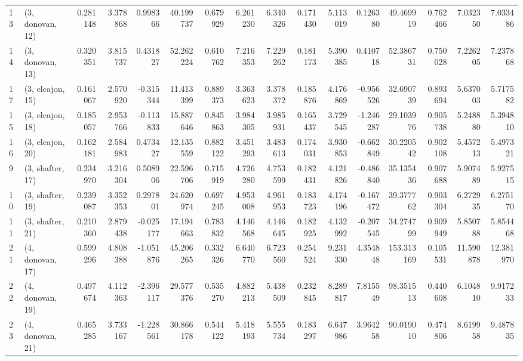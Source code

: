 \begin{tabular}{llrrrrrrrrrrrrrr}
13 &  (3, donovan, 12) &   0.281148 &  3.378868 &  0.998366 &  40.199737 &  0.679929 &   6.261230 &  6.340326 &  0.171430 &  5.113019 &  0.126380 &   49.469919 &  0.762466 &   7.032350 &   7.033486 \\
14 &  (3, donovan, 13) &   0.320351 &  3.815737 &  0.431827 &  52.262224 &  0.610762 &   7.216353 &  7.229262 &  0.181173 &  5.390385 &  0.410718 &   52.386731 &  0.750028 &   7.226205 &   7.237868 \\
17 &  (3, elcajon, 15) &   0.161067 &  2.570920 & -0.315344 &  11.413399 &  0.889373 &   3.363623 &  3.378372 &  0.185876 &  4.176869 & -0.956526 &   32.690739 &  0.893694 &   5.637003 &   5.717582 \\
15 &  (3, elcajon, 18) &   0.185057 &  2.953766 & -0.113833 &  15.887646 &  0.845863 &   3.984305 &  3.985931 &  0.165437 &  3.729545 & -1.246287 &   29.103976 &  0.905738 &   5.248880 &   5.394810 \\
16 &  (3, elcajon, 20) &   0.162181 &  2.584983 &  0.473427 &  12.135559 &  0.882122 &   3.451293 &  3.483613 &  0.174031 &  3.930853 & -0.662849 &   30.220542 &  0.902108 &   5.457213 &   5.497321 \\
9  &  (3, shafter, 17) &   0.234970 &  3.216304 &  0.508906 &  22.596706 &  0.715919 &   4.726280 &  4.753599 &  0.182431 &  4.121826 & -0.486840 &   35.135436 &  0.907688 &   5.907489 &   5.927515 \\
10 &  (3, shafter, 19) &   0.239087 &  3.352353 &  0.297801 &  24.620974 &  0.697245 &   4.953008 &  4.961953 &  0.183723 &  4.174196 & -0.167472 &   39.377762 &  0.903304 &   6.272935 &   6.275170 \\
11 &  (3, shafter, 21) &   0.210360 &  2.879438 & -0.025177 &  17.194663 &  0.783832 &   4.146568 &  4.146645 &  0.182925 &  4.132992 & -0.207545 &   34.274799 &  0.909949 &   5.850788 &   5.854468 \\
21 &  (4, donovan, 17) &   0.599296 &  4.808388 & -1.051876 &  45.206265 &  0.332326 &   6.640770 &  6.723560 &  0.254524 &  9.231330 &  4.354848 &  153.313169 &  0.105531 &  11.590878 &  12.381970 \\
22 &  (4, donovan, 19) &   0.497674 &  4.112363 & -2.396117 &  29.577376 &  0.535270 &   4.882213 &  5.438509 &  0.232845 &  8.289817 &  7.815549 &   98.351513 &  0.440608 &   6.104810 &   9.917233 \\
23 &  (4, donovan, 21) &   0.465285 &  3.733167 & -1.228561 &  30.866178 &  0.544122 &   5.418193 &  5.555734 &  0.183297 &  6.647986 &  3.964258 &   90.019010 &  0.474806 &   8.619958 &   9.487835 \\

\end{tabular}
